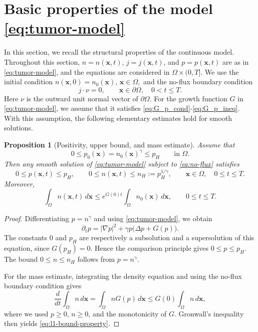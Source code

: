 \documentclass[11pt]{article}
\theoremstyle{plain}
\numberwithin{equation}{section}
\newtheorem{proposition}{Proposition}[section]
\begin{document}
\section{Basic properties of the model \eqref{eq:tumor-model}}\label{sec:model}
In this section, we recall the structural properties of the continuous model.
Throughout this
section, \(n=n(\mathbf{x},t)\), \(j=j(\mathbf{x},t)\), and \(p=p(\mathbf{x},t)\) are as in
\eqref{eq:tumor-model}, and the equations are considered in
\(\Omega\times(0,T]\). 
We use the initial condition
$
    n(\mathbf{x},0)=n_0(\mathbf{x}), \,  \mathbf{x}\in\Omega ,
$
and the no-flux boundary condition
\begin{equation}\label{eq:no-flux}
    j\cdot\nu=0,
    \qquad \mathbf{x}\in\partial\Omega,\quad 0<t\le T .
\end{equation}
Here \(\nu\) is the outward unit normal vector of $\partial \Omega$.
For the growth function \(G\) in \eqref{eq:tumor-model}, we assume that
it satisfies \eqref{eq:G_p_cond}-\eqref{eq:G_p_ineq}.
With this assumption, the following elementary estimates hold for smooth
solutions.
\begin{proposition}[Positivity, upper bound, and mass estimate]
\label{prop:continuous-bounds}
Assume that
\[
    0\le p_0(\mathbf{x})=n_0(\mathbf{x})^\gamma\le p_H
    \qquad \text{in } \Omega .
\]
Then any smooth solution of \eqref{eq:tumor-model} subject to
 \eqref{eq:no-flux} satisfies
\[
    0\le p(\mathbf{x},t)\le p_H,
    \qquad
    0\le n(\mathbf{x},t)\le n_H:=p_H^{1/\gamma},
    \qquad \mathbf{x}\in\Omega,\quad 0\le t\le T .
\]
Moreover,
\begin{equation}\label{eq:l1-bound-property}
    \int_\Omega n(\mathbf{x},t)\,d\mathbf{x}
    \le
    e^{G(0)t}\int_\Omega n_0(\mathbf{x})\,d\mathbf{x},
    \qquad 0\le t\le T .
\end{equation}
\end{proposition}

\begin{proof}
Differentiating \(p=n^\gamma\) and using \eqref{eq:tumor-model}, we obtain
\begin{equation}\label{eq:pressure-equation-property}
    \partial_t p
    =
    |\nabla p|^2+\gamma p\bigl(\Delta p+G(p)\bigr).
\end{equation}
The constants \(0\) and \(p_H\) are respectively a subsolution and a
supersolution of this equation, since \(G(p_H)=0\). Hence the comparison
principle gives \(0\le p\le p_H\). The bound
\(0\le n\le n_H\) follows from \(p=n^\gamma\).

For the mass estimate, integrating the density equation and using the
no-flux boundary condition gives
\[
    \frac{d}{dt}\int_\Omega n\,d\mathbf{x}
    =
    \int_\Omega nG(p)\,d\mathbf{x}
    \le
    G(0)\int_\Omega n\,d\mathbf{x},
\]
where we used \(p\ge0\), \(n\ge0\), and the monotonicity of \(G\).
Gronwall's inequality then yields \eqref{eq:l1-bound-property}.
\end{proof}
\end{document}
